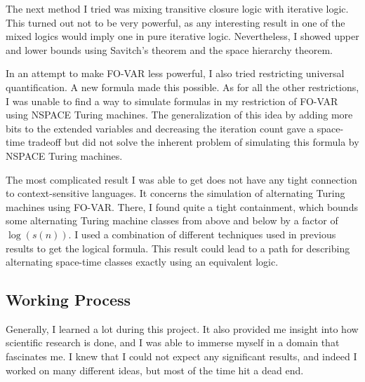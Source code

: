 The next method I tried was mixing transitive closure logic with iterative logic.
This turned out not to be very powerful, as any interesting result in one of the mixed logics would imply one in pure iterative logic.
Nevertheless, I showed upper and lower bounds using Savitch's theorem and the space hierarchy theorem.

In an attempt to make FO-VAR less powerful, I also tried restricting universal quantification.
A new formula made this possible.
As for all the other restrictions, I was unable to find a way to simulate formulas in my restriction of FO-VAR using NSPACE Turing machines.
The generalization of this idea by adding more bits to the extended variables and decreasing the iteration count gave a space-time tradeoff but did not solve the inherent problem of simulating this formula by NSPACE Turing machines.

The most complicated result I was able to get does not have any tight connection to context-sensitive languages.
It concerns the simulation of alternating Turing machines using FO-VAR\@.
There, I found quite a tight containment, which bounds some alternating Turing machine classes from above and below by a factor of $\log(s(n))$.
I used a combination of different techniques used in previous results to get the logical formula.
This result could lead to a path for describing alternating space-time classes exactly using an equivalent logic.

\subsection{Working Process}\label{subsec:working-process}
Generally, I learned a lot during this project.
It also provided me insight into how scientific research is done, and I was able to immerse myself in a domain that fascinates me.
I knew that I could not expect any significant results, and indeed I worked on many different ideas, but most of the time hit a dead end.

